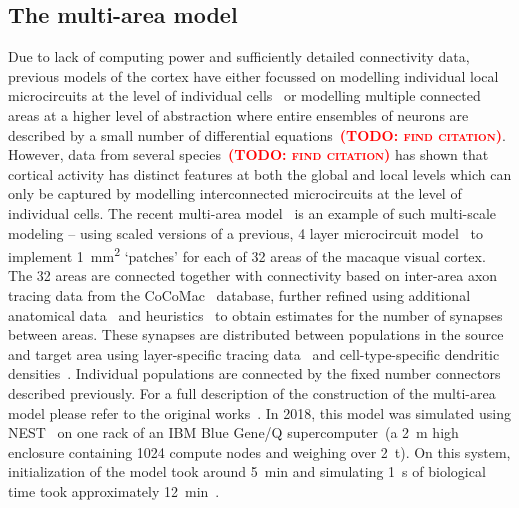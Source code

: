 \documentclass[9pt,twocolumn,twoside,lineno]{pnas-new}
\newcommand{\todo}[1]{\textbf{\textsc{\textcolor{red}{(TODO: #1)}}}}
\begin{document}
\subsection*{The multi-area model}
Due to lack of computing power and sufficiently detailed connectivity data, previous models of the cortex have either focussed on modelling individual local microcircuits at the level of individual cells~\citep{Izhikevich2008,Potjans2012} or modelling multiple connected areas at a higher level of abstraction where entire ensembles of neurons are described by a small number of differential equations~\todo{find citation}.
However, data from several species~\todo{find citation} has shown that cortical activity has distinct features at both the global and local levels which can only be captured by modelling interconnected microcircuits at the level of individual cells.
The recent multi-area model~\citep{Schmidt2018a,Schmidt2018} is an example of such multi-scale modeling -- using scaled versions of a previous, 4 layer microcircuit model~\citep{Potjans2012} to implement \SI{1}{\milli\meter\squared} `patches' for each of 32 areas of the macaque visual cortex.
The 32 areas are connected together with connectivity based on inter-area axon tracing data from the CoCoMac~\citep{Bakker2012} database, further refined using additional anatomical data~\citep{Markov2014} and heuristics~\citep{Ercsey-Ravasz2013} to obtain estimates for the number of synapses between areas.
These synapses are distributed between populations in the source and target area using layer-specific tracing data~\citep{Markov2014b} and cell-type-specific dendritic densities~\citep{Binzegger2004}.
Individual populations are connected by the fixed number connectors described previously.
For a full description of the construction of the multi-area model please refer to the original works~\citep{Schmidt2018a,Schmidt2018}.
In 2018, this model was simulated using NEST~\citep{Gewaltig2007} on one rack of an IBM Blue Gene/Q supercomputer~(a \SI{2}{\metre} high enclosure containing \num{1024} compute nodes and weighing over \SI{2}{\tonne}).
On this system, initialization of the model took around \SI{5}{\minute} and simulating \SI{1}{\second} of biological time took approximately \SI{12}{\minute}~\citep{Schmidt2018}.
\end{document}
